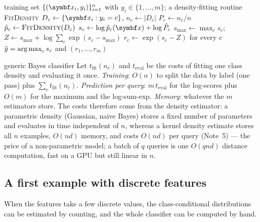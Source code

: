 \documentclass[11pt]{article}
\begin{document}
\begin{algorithm}[tbp]
\caption{Generic Bayes classifier (any density estimator)}\label{alg:bayes}
\footnotesize
\begin{algorithmic}[1]
\Require training set $\{(\x_i, y_i)\}_{i=1}^n$ with $y_i \in \{1, \dots, m\}$; a density-fitting routine \textsc{FitDensity}
    \State $D_c \gets \{\x_i : y_i = c\}$, \quad $n_c \gets |D_c|$ 
    \State $\hat P_c \gets n_c / n$ 
    \State $\hat p_c \gets \Call{FitDensity}{D_c}$ 
  \EndFor
\EndFunction
{}
    \State $s_c \gets \log \hat p_c(\x) + \log \hat P_c$ 
  \EndFor
  \State $s_{\max} \gets \max_c s_c$; \quad $Z \gets s_{\max} + \log \sum_{c} \exp(s_c - s_{\max})$ 
  \State $r_c \gets \exp(s_c - Z)$ for every $c$ 
  \State \Return $\hat y = \operatorname*{arg\,max}_c s_c$ and $(r_1, \dots, r_m)$
\EndFunction
\end{algorithmic}
\end{algorithm}

\begin{runtime}{generic Bayes classifier}
Let $t_{\mathrm{fit}}(n_c)$ and $t_{\mathrm{eval}}$ be the costs of fitting one class density and evaluating it once.
\emph{Training}: $O(n)$ to split the data by label (one pass) plus $\sum_c t_{\mathrm{fit}}(n_c)$.
\emph{Prediction per query}: $m\, t_{\mathrm{eval}}$ for the log-scores plus $O(m)$ for the maximum and the log-sum-exp.
\emph{Memory}: whatever the $m$ estimators store. The costs therefore come from the density estimator: a parametric
density (Gaussian, naive Bayes) stores a fixed number of parameters and evaluates in time independent of $n$, whereas a
kernel density estimate stores all $n$ examples, $O(nd)$ memory, and costs $O(nd)$ per query (Note~5) --- the price of
a non-parametric model; a batch of $q$ queries is one $O(qnd)$ distance computation, fast on a GPU but still linear in $n$.
\end{runtime}

\subsection{A first example with discrete features}

When the features take a few discrete values, the class-conditional distributions can be estimated by counting, and
the whole classifier can be computed by hand.
\end{document}
